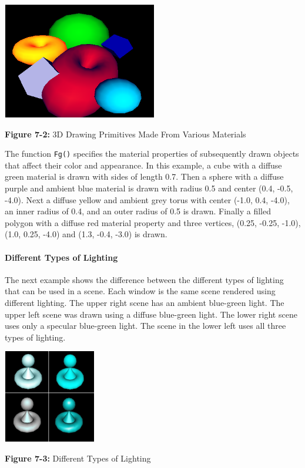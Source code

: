 \begin{center}
\includegraphics[width=2.65in,height=2.0in]{ub-img/ub-img32.png} 

{\sffamily\bfseries Figure 7-2:}
{\sffamily 3D Drawing Primitives Made From Various Materials}
\end{center}

The function \texttt{Fg()} specifies the material properties of
subsequently drawn objects that affect their color and appearance.  In
this example, a cube with a diffuse green material is drawn with sides
of length 0.7. Then a sphere with a diffuse purple and ambient blue
material is drawn with radius 0.5 and center (0.4, -0.5, -4.0). Next a
diffuse yellow and ambient grey torus with center (-1.0, 0.4, -4.0),
an inner radius of 0.4, and an outer radius of 0.5 is drawn. Finally a
filled polygon with a diffuse red material property and three
vertices, (0.25, -0.25, -1.0), (1.0, 0.25, -4.0) and (1.3, -0.4, -3.0)
is drawn.

\paragraph{Different Types of Lighting}

The next example shows the difference between the different types of
lighting that can be used in a scene. Each window is the same scene
rendered using different lighting. The upper right scene has an
ambient blue-green light. The upper left scene was drawn using a
diffuse blue-green light. The lower right scene uses only a specular
blue-green light. The scene in the lower left uses all three types of
lighting.

\begin{center}
{\includegraphics[width=1.6in,height=1.6in]{ub-img/ub-img33.jpg}}

{\sffamily\bfseries Figure 7-3:}
{\sffamily Different Types of Lighting}
\end{center}

